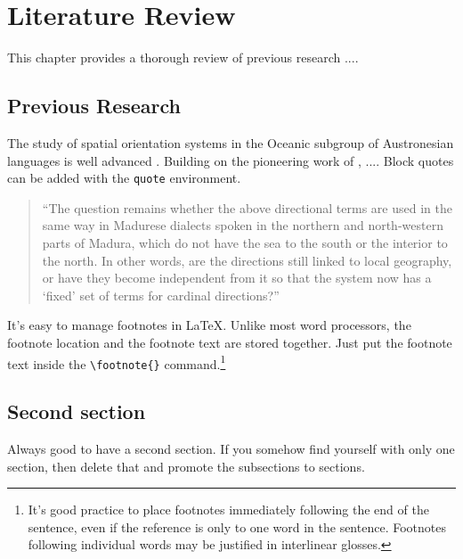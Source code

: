 \chapter{Literature Review}\label{chap:litreview}

This chapter provides a thorough review of previous research ....

\section{Previous Research}\label{sec:previous}
The study of spatial orientation systems in the Oceanic subgroup of Austronesian languages is well advanced \citep{francois2004,francois2015,palmer2015,bennardo2002,senft2004}. Building on the pioneering work of \citet{adelaar1997}, .... Block quotes can be added with the \verb|quote| environment. 

\begin{quote}
``The question remains whether the above directional terms are used in the same way in Madurese dialects spoken in the northern and north-western parts of Madura, which do not have the sea to the south or the interior to the north. In other words, are the directions still linked to local geography, or have they become independent from it so that the system now has a `fixed' set of terms for cardinal directions?'' \citep[57]{adelaar1997}
\end{quote}


\noindent
It's easy to manage footnotes in \LaTeX. Unlike most word processors, the footnote location and the footnote text are stored together. Just put the footnote text inside the \verb|\footnote{}| command.\footnote{It's good practice to place footnotes immediately following the end of the sentence, even if the reference is only to one word in the sentence. Footnotes following individual words may be justified in interlinear glosses.} 


\section{Second section}
Always good to have a second section. If you somehow find yourself with only one section, then delete that and promote the subsections to sections. 

